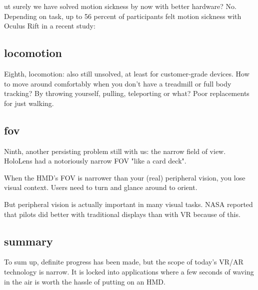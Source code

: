 ut surely we have solved motion sickness by now with better hardware? No. Depending on task, up to 56 percent of participants felt motion sickness with Oculus Rift in a recent study: 


\subsection{locomotion}
Eighth, locomotion: also still unsolved, at least for customer-grade devices. How to move around comfortably when you don't have a treadmill or full body tracking? By throwing yourself, pulling, teleporting or what? Poor replacements for just walking.



\subsection{fov}
Ninth, another persisting problem still with us: the narrow field of view. HoloLens had a notoriously narrow FOV "like a card deck". 

When the HMD's FOV is narrower than your (real) peripheral vision, you lose visual context. Users need to turn and glance around to orient. 

But peripheral vision is actually important in many visual tasks. NASA reported that pilots did better with traditional displays than with VR because of this. 


\subsection{summary}
To sum up, definite progress has been made, but the scope of today's VR/AR technology is narrow. It is locked into applications where a few seconds of waving in the air is worth the hassle of putting on an HMD.


